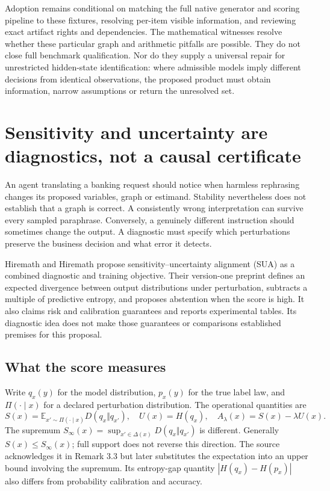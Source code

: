 Adoption remains conditional on matching the full native generator and scoring pipeline to these fixtures, resolving per-item visible information, and reviewing exact artifact rights and dependencies. The mathematical witnesses resolve whether these particular graph and arithmetic pitfalls are possible. They do not close full benchmark qualification. Nor do they supply a universal repair for unrestricted hidden-state identification: where admissible models imply different decisions from identical observations, the proposed product must obtain information, narrow assumptions or return the unresolved set.~\citep{exec25_bor_reference}



\section{Sensitivity and uncertainty are diagnostics, not a causal certificate}
\label{sec:exec23-sua-review}
An agent translating a banking request should notice when harmless rephrasing
changes its proposed variables, graph or estimand. Stability nevertheless does
not establish that a graph is correct. A consistently wrong interpretation can
survive every sampled paraphrase. Conversely, a genuinely different instruction
should sometimes change the output. A diagnostic must specify which
perturbations preserve the business decision and what error it detects.

Hiremath and Hiremath propose sensitivity--uncertainty alignment (SUA) as a
combined diagnostic and training objective. Their version-one preprint defines
an expected divergence between output distributions under perturbation,
subtracts a multiple of predictive entropy, and proposes abstention when the
score is high. It also claims risk and calibration guarantees and reports
experimental tables. Its diagnostic idea does not make those guarantees or
comparisons established premises for this proposal. \citep{exec23_sua_original}

\subsection{What the score measures}
Write $q_x(y)$ for the model distribution, $p_x(y)$ for the true label law,
and $\Pi(\cdot\mid x)$ for a declared perturbation distribution. The
operational quantities are
\[
 S(x)=\mathbb E_{x'\sim\Pi(\cdot\mid x)}D(q_x\Vert q_{x'}),
 \quad U(x)=H(q_x),\quad A_\lambda(x)=S(x)-\lambda U(x).
\]
The supremum $S_\infty(x)=\sup_{x'\in\Delta(x)}D(q_x\Vert q_{x'})$
is different. Generally $S(x)\leq S_\infty(x)$; full support does not reverse
this direction. The source acknowledges it in Remark 3.3 but later substitutes
the expectation into an upper bound involving the supremum. Its entropy-gap
quantity $|H(q_x)-H(p_x)|$ also differs from probability calibration and
accuracy. \citep{exec23_sua_original}


